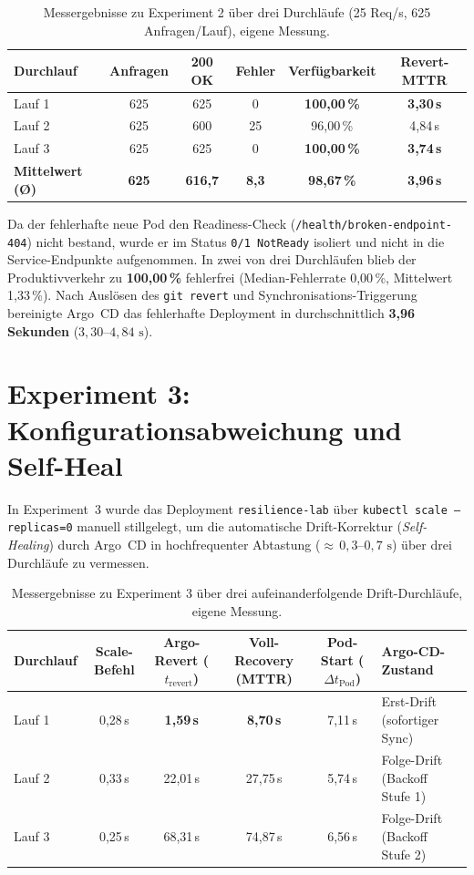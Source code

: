 \begin{table}[H]
\centering
\small
\begin{tabular}{lccccc}
\toprule
\textbf{Durchlauf} & \textbf{Anfragen} & \textbf{200 OK} & \textbf{Fehler} & \textbf{Verfügbarkeit} & \textbf{Revert-MTTR} \\
\midrule
Lauf 1 & 625 & 625 & 0  & \textbf{100,00\,\%} & \textbf{3,30\,s} \\
Lauf 2 & 625 & 600 & 25 & 96,00\,\%           & 4,84\,s \\
Lauf 3 & 625 & 625 & 0  & \textbf{100,00\,\%} & \textbf{3,74\,s} \\
\midrule
\textbf{Mittelwert (\O)} & \textbf{625} & \textbf{616,7} & \textbf{8,3} & \textbf{98,67\,\%} & \textbf{3,96\,s} \\
\bottomrule
\end{tabular}
\caption{Messergebnisse zu Experiment 2 über drei Durchläufe (25 Req/s, 625 Anfragen/Lauf), eigene Messung.}
\label{tab:messung-exp2}
\end{table}

Da der fehlerhafte neue Pod den Readiness-Check (\texttt{/health/broken-endpoint-404}) nicht bestand, wurde er im Status \texttt{0/1 NotReady} isoliert und nicht in die Service-Endpunkte aufgenommen. In zwei von drei Durchläufen blieb der Produktivverkehr zu \textbf{100,00\,\%} fehlerfrei (Median-Fehlerrate 0{,}00\,\%, Mittelwert 1{,}33\,\%). Nach Auslösen des \texttt{git revert} und Synchronisations-Triggerung bereinigte Argo~CD das fehlerhafte Deployment in durchschnittlich \textbf{3,96 Sekunden} ($3{,}30\text{--}4{,}84\text{ s}$).

\section{Experiment 3: Konfigurationsabweichung und Self-Heal}
\label{sec:ergebnis-exp3}
In Experiment~3 wurde das Deployment \texttt{resilience-lab} über \texttt{kubectl scale --replicas=0} manuell stillgelegt, um die automatische Drift-Korrektur (\textit{Self-Healing}) durch Argo~CD in hochfrequenter Abtastung ($\approx\,0{,}3\text{--}0{,}7\text{ s}$) über drei Durchläufe zu vermessen.

\begin{table}[H]
\centering
\small
\begin{tabular}{lccccl}
\toprule
\textbf{Durchlauf} & \textbf{Scale-Befehl} & \textbf{Argo-Revert ($t_{\text{revert}}$)} & \textbf{Voll-Recovery (MTTR)} & \textbf{Pod-Start ($\Delta t_{\text{Pod}}$)} & \textbf{Argo-CD-Zustand} \\
\midrule
Lauf 1 & 0,28\,s & \textbf{1,59\,s} & \textbf{8,70\,s} & 7,11\,s & Erst-Drift (sofortiger Sync) \\
Lauf 2 & 0,33\,s & 22,01\,s         & 27,75\,s         & 5,74\,s & Folge-Drift (Backoff Stufe 1) \\
Lauf 3 & 0,25\,s & 68,31\,s         & 74,87\,s         & 6,56\,s & Folge-Drift (Backoff Stufe 2) \\
\bottomrule
\end{tabular}
\caption{Messergebnisse zu Experiment 3 über drei aufeinanderfolgende Drift-Durchläufe, eigene Messung.}
\label{tab:messung-exp3}
\end{table}

